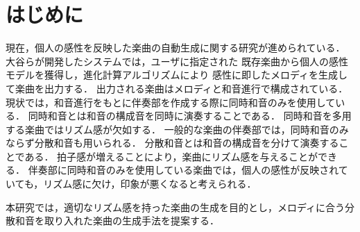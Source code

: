 \chapter{はじめに}
現在，個人の感性を反映した楽曲の自動生成に関する研究が進められている．
大谷らが開発したシステム\cite{otani16}では，ユーザに指定された
既存楽曲から個人の感性モデルを獲得し，進化計算アルゴリズムにより
感性に即したメロディを生成して楽曲を出力する．
出力される楽曲はメロディと和音進行で構成されている．
現状では，和音進行をもとに伴奏部を作成する際に同時和音のみを使用している．
同時和音とは和音の構成音を同時に演奏することである．
同時和音を多用する楽曲ではリズム感が欠如する．
一般的な楽曲の伴奏部では，同時和音のみならず分散和音も用いられる．
分散和音とは和音の構成音を分けて演奏することである．
拍子感が増えることにより，楽曲にリズム感を与えることができる．
伴奏部に同時和音のみを使用している楽曲では，個人の感性が反映されていても，リズム感に欠け，印象が悪くなると考えられる．

本研究では，適切なリズム感を持った楽曲の生成を目的とし，メロディに合う分散和音を取り入れた楽曲の生成手法を提案する．
